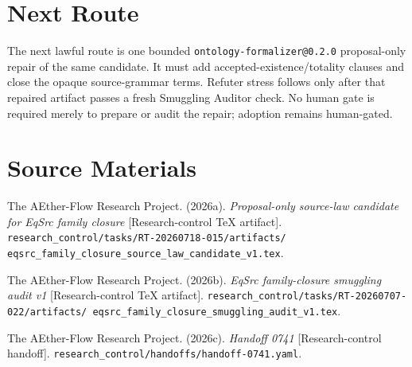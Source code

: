 \documentclass[11pt]{article}
\begin{document}
\section{Next Route}

The next lawful route is one bounded
\texttt{ontology-formalizer@0.2.0} proposal-only repair of the same candidate.
It must add accepted-existence/totality clauses and close the opaque
source-grammar terms. Refuter stress follows only after that repaired artifact
passes a fresh Smuggling Auditor check. No human gate is required merely to
prepare or audit the repair; adoption remains human-gated.

\section{Source Materials}

The AEther-Flow Research Project. (2026a). \emph{Proposal-only source-law
candidate for EqSrc family closure} [Research-control TeX artifact].
\texttt{research\_control/tasks/RT-20260718-015/artifacts/
eqsrc\_family\_closure\_source\_law\_candidate\_v1.tex}.

The AEther-Flow Research Project. (2026b). \emph{EqSrc family-closure
smuggling audit v1} [Research-control TeX artifact].
\texttt{research\_control/tasks/RT-20260707-022/artifacts/
eqsrc\_family\_closure\_smuggling\_audit\_v1.tex}.

The AEther-Flow Research Project. (2026c). \emph{Handoff 0741}
[Research-control handoff].
\texttt{research\_control/handoffs/handoff-0741.yaml}.
\end{document}
